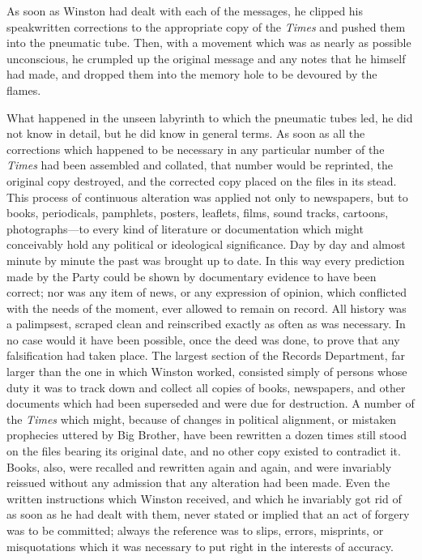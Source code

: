As soon as Winston had dealt with each of the messages, he clipped his
speakwritten corrections to the appropriate copy of the \emph{Times} and
pushed them into the pneumatic tube. Then, with a movement which was as
nearly as possible unconscious, he crumpled up the original message and
any notes that he himself had made, and dropped them into the memory
hole to be devoured by the flames.

What happened in the unseen labyrinth to which the pneumatic tubes led,
he did not know in detail, but he did know in general terms. As soon as
all the corrections which happened to be necessary in any particular
number of the \emph{Times} had been assembled and collated, that number
would be reprinted, the original copy destroyed, and the corrected copy
placed on the files in its stead. This process of continuous alteration
was applied not only to newspapers, but to books, periodicals,
pamphlets, posters, leaflets, films, sound tracks, cartoons,
photographs---to every kind of literature or documentation which might
conceivably hold any political or ideological significance. Day by day
and almost minute by minute the past was brought up to date. In this way
every prediction made by the Party could be shown by documentary
evidence to have been correct; nor was any item of news, or any
expression of opinion, which conflicted with the needs of the moment,
ever allowed to remain on record. All history was a palimpsest, scraped
clean and reinscribed exactly as often as was necessary. In no case
would it have been possible, once the deed was done, to prove that any
falsification had taken place. The largest section of the Records
Department, far larger than the one in which Winston worked, consisted
simply of persons whose duty it was to track down and collect all copies
of books, newspapers, and other documents which had been superseded and
were due for destruction. A number of the \emph{Times} which might,
because of changes in political alignment, or mistaken prophecies
uttered by Big Brother, have been rewritten a dozen times still stood on
the files bearing its original date, and no other copy existed to
contradict it. Books, also, were recalled and rewritten again and again,
and were invariably reissued without any admission that any alteration
had been made. Even the written instructions which Winston received, and
which he invariably got rid of as soon as he had dealt with them, never
stated or implied that an act of forgery was to be committed; always the
reference was to slips, errors, misprints, or misquotations which it was
necessary to put right in the interests of accuracy.

